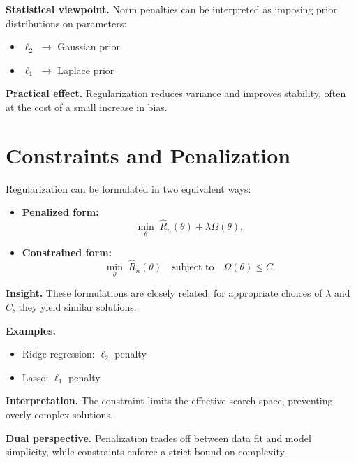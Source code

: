 \medskip

\noindent
\textbf{Statistical viewpoint.}  
Norm penalties can be interpreted as imposing prior distributions on parameters:
\begin{itemize}
    \item $\ell_2$ $\rightarrow$ Gaussian prior
    \item $\ell_1$ $\rightarrow$ Laplace prior
\end{itemize}

\medskip

\noindent
\textbf{Practical effect.}  
Regularization reduces variance and improves stability, often at the cost of a small increase in bias.

\section{Constraints and Penalization}

Regularization can be formulated in two equivalent ways:
\begin{itemize}
    \item \textbf{Penalized form:}
    \[
    \min_\theta \; \hat{R}_n(\theta) + \lambda \Omega(\theta),
    \]
    \item \textbf{Constrained form:}
    \[
    \min_\theta \; \hat{R}_n(\theta) \quad \text{subject to} \quad \Omega(\theta) \leq C.
    \]
\end{itemize}

\medskip

\noindent
\textbf{Insight.}  
These formulations are closely related: for appropriate choices of $\lambda$ and $C$, they yield similar solutions.

\medskip

\noindent
\textbf{Examples.}
\begin{itemize}
    \item Ridge regression: $\ell_2$ penalty
    \item Lasso: $\ell_1$ penalty
\end{itemize}

\medskip

\noindent
\textbf{Interpretation.}  
The constraint limits the effective search space, preventing overly complex solutions.

\medskip

\noindent
\textbf{Dual perspective.}  
Penalization trades off between data fit and model simplicity, while constraints enforce a strict bound on complexity.

